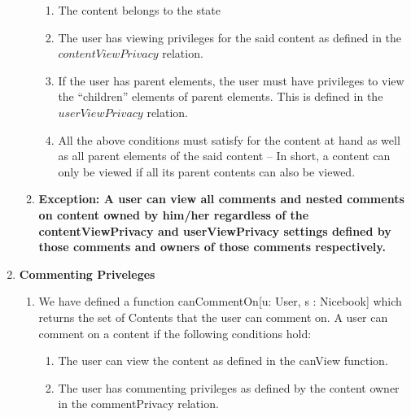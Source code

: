 \documentclass[titlepage]{article}
\begin{document}
\begin{enumerate}
\begin{enumerate}
	      \begin{enumerate}
		      \item The content belongs to the state
		      \item The user has viewing privileges for the said content as defined in the $contentViewPrivacy$ relation.
		      \item If the user has parent elements, the user must have privileges to view the “children” elements of parent elements. This is defined in the $userViewPrivacy$ relation.
		      \item All the above conditions must satisfy for the content at hand as well as all parent elements of the said content – In short, a content can only be viewed if all its parent contents can also be viewed.
	      \end{enumerate}
	      \item\textbf{Exception: A user can view all comments and nested comments on content owned by him/her regardless of the contentViewPrivacy and userViewPrivacy settings defined by those comments and owners of those comments respectively.}
\end{enumerate}
\item\textbf{Commenting Priveleges}
\begin{enumerate}
	\item We have defined a function canCommentOn[u: User, s : Nicebook] which returns the set of Contents that the user can comment on. A user can comment on a content if the following conditions hold:
	      \begin{enumerate}
		      \item The user can view the content as defined in the canView function.
		      \item The user has commenting privileges as defined by the content owner in the commentPrivacy relation.


\end{enumerate}
\end{enumerate}
\end{enumerate}
\end{document}

